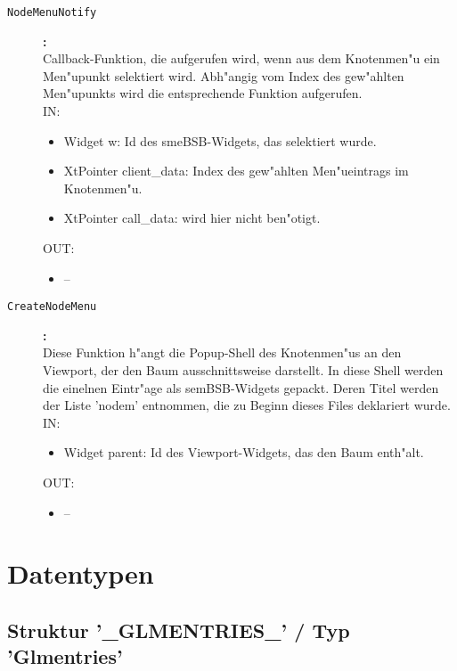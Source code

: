 \begin{description}
\item[\tt NodeMenuNotify]{\bf :\\}
Callback-Funktion, die aufgerufen wird, wenn aus dem Knotenmen"u ein Men"upunkt selektiert wird. Abh"angig vom Index des gew"ahlten Men"upunkts wird die entsprechende Funktion aufgerufen. \\
IN:
\begin{itemize}
   \item Widget w:      Id des smeBSB-Widgets, das selektiert wurde. \item XtPointer client\_data: Index des gew"ahlten Men"ueintrags im Knotenmen"u. \item XtPointer call\_data:   wird hier nicht ben"otigt.
\end{itemize}
OUT:
\begin{itemize}
   \item --
\end{itemize}

\item[\tt CreateNodeMenu]{\bf :\\}
Diese Funktion h"angt die Popup-Shell des Knotenmen"us an den Viewport, der den Baum ausschnittsweise darstellt. In diese Shell werden die einelnen Eintr"age als semBSB-Widgets gepackt. Deren Titel werden der Liste 'nodem' entnommen, die zu Beginn dieses Files deklariert wurde. \\
IN:
\begin{itemize}
   \item Widget parent: Id des Viewport-Widgets, das den Baum enth"alt.
\end{itemize}
OUT:
\begin{itemize}
   \item --
\end{itemize}
\end{description}

\section{Datentypen}

\subsection{Struktur '\_GLMENTRIES\_' / Typ 'Glmentries'}

